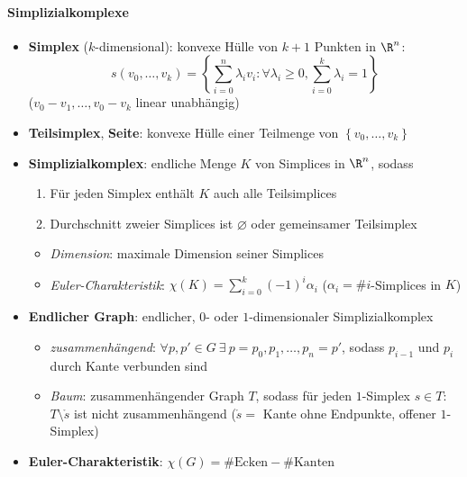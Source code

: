 \paragraph{Simplizialkomplexe}
\begin{itemize}
  \item \textbf{Simplex} (\( k \)-dimensional): konvexe Hülle von \( k+1 \) Punkten in \( \R^n \):
  \begin{equation*}
    s(v_0,\dots,v_k) = \left \{ \sum_{i=0}^n \lambda_i v_i : \forall \lambda_i \geq 0, \sum_{i=0}^k \lambda_i = 1 \right \}
  \end{equation*}
  (\( v_0-v_1, \dots, v_0-v_k \) linear unabhängig)
  \item \textbf{Teilsimplex}, \textbf{Seite}: konvexe Hülle einer Teilmenge von \( \left \{ v_0,\dots,v_k \right \} \)
  \item \textbf{Simplizialkomplex}: endliche Menge \( K \) von Simplices in \( \R^n \), sodass
  \begin{enumerate}
    \item Für jeden Simplex enthält \( K \) auch alle Teilsimplices
    \item Durchschnitt zweier Simplices ist \( \varnothing \) oder gemeinsamer Teilsimplex
  \end{enumerate}
  \begin{itemize}
    \item \emph{Dimension}: maximale Dimension seiner Simplices
    \item \emph{Euler-Charakteristik}: \( \chi(K) = \sum_{i=0}^k {(-1)}^i \alpha_i \) (\( \alpha_i = \# i \)-Simplices in \( K \))
  \end{itemize}
  \item \textbf{Endlicher Graph}: endlicher, \( 0 \)- oder \( 1 \)-dimensionaler Simplizialkomplex
  \begin{itemize}
    \item \emph{zusammenhängend}: \( \forall p, p' \in G \ \exists \ p = p_0,p_1,\dots,p_n = p' \), sodass \( p_{i-1} \) und \( p_i \) durch Kante verbunden sind
    \item \emph{Baum}: zusammenhängender Graph \( T \), sodass für jeden \( 1 \)-Simplex \( s \in T \): \( T \setminus \mathring{s} \) ist nicht zusammenhängend (\( \mathring{s} = \) Kante ohne Endpunkte, offener \( 1 \)-Simplex)
  \end{itemize}
  \item \textbf{Euler-Charakteristik}: \( \chi(G) = \# \text{Ecken} - \# \text{Kanten} \)
  \begin{itemize}

\end{itemize}
\end{itemize}
